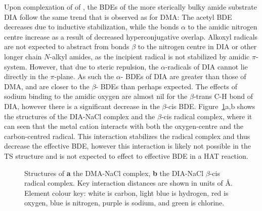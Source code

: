 Upon complexation of  of , the BDEs of the more sterically bulky amide substrate DIA follow the same trend that is observed as for DMA: The acetyl  BDE decreases due to inductive stabilization, while the  bonds $\alpha$ to the amidic nitrogen centre increase as a result of decreased hyperconjugative overlap. Alkoxyl radicals are not expected to abstract from  bonds $\beta$ to the nitrogen centre in DIA or other longer chain $N$-alkyl amides, as the incipient radical is not stabilized by amidic $\pi$-system. However, that due to steric repulsion, the $\alpha$-radicals of DIA cannot lie directly in the $\pi$-plane. As such the $\alpha$- BDEs of DIA are greater than those of DMA, and are closer to the $\beta$- BDEs than perhaps expected. The effects of sodium binding to the amidic oxygen are almost nil for the $\beta$-trans C-H bond of DIA, however there is a significant decrease in the $\beta$-cis  BDE. Figure~\ref{fig:dia-na-cl}a,b shows the structures of the DIA-NaCl complex and the $\beta$-cis radical complex, where it can seen that the metal cation interacts with both the oxygen-centre and the carbon-centred radical. This interaction stabilizes the radical complex and thus decrease the effective BDE, however this interaction is likely not possible in the TS structure and is not expected to effect to effective BDE in a HAT reaction.

\begin{figure}[!htbp]
	\centering


  \caption[Structures of the DIA-NaCl complex and radical complex.]{Structures of \textbf{a} the DMA-NaCl complex, \textbf{b} the DIA-NaCl $\beta$-cis radical complex. Key interaction distances are shown in units of \AA. Element colour key: white is carbon, light blue is hydrogen, red is oxygen, blue is nitrogen, purple is sodium, and green is chlorine.}
	\label{fig:dia-na-cl}
\end{figure}

